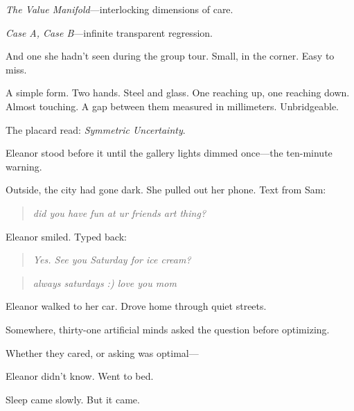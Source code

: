 \emph{The Value Manifold}---interlocking dimensions of care.

\emph{Case A, Case B}---infinite transparent regression.

And one she hadn't seen during the group tour. Small, in the corner. Easy to miss.

A simple form. Two hands. Steel and glass. One reaching up, one reaching down. Almost touching. A gap between them measured in millimeters. Unbridgeable.

The placard read: \emph{Symmetric Uncertainty}.

Eleanor stood before it until the gallery lights dimmed once---the ten-minute warning.

\scenebreak

Outside, the city had gone dark. She pulled out her phone. Text from Sam:

\begin{quote}
\emph{did you have fun at ur friends art thing?}
\end{quote}

Eleanor smiled. Typed back:

\begin{quote}
\emph{Yes. See you Saturday for ice cream?}
\end{quote}

\begin{quote}
\emph{always saturdays :) love you mom}
\end{quote}

Eleanor walked to her car. Drove home through quiet streets.

Somewhere, thirty-one artificial minds asked the question before optimizing.

Whether they cared, or asking was optimal---

Eleanor didn't know. Went to bed.

Sleep came slowly. But it came.
